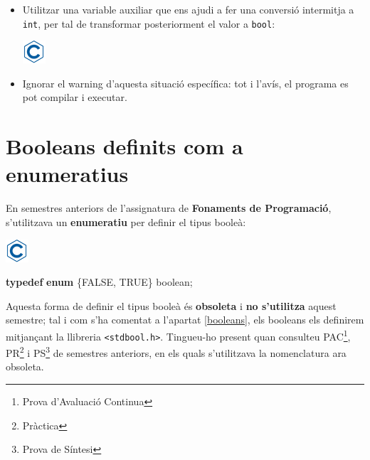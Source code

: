 \documentclass[]{book}
\newenvironment{Shaded}{\begin{snugshade}}{\end{snugshade}}
\newcommand{\KeywordTok}[1]{\textcolor[rgb]{0.13,0.29,0.53}{\textbf{#1}}}
\newcommand{\DataTypeTok}[1]{\textcolor[rgb]{0.13,0.29,0.53}{#1}}
\newcommand{\StringTok}[1]{\textcolor[rgb]{0.31,0.60,0.02}{#1}}
\newcommand{\NormalTok}[1]{#1}
\providecommand{\tightlist}{%
  \setlength{\itemsep}{0pt}\setlength{\parskip}{0pt}}
\let\rmarkdownfootnote\footnote%
\def\footnote{\protect\rmarkdownfootnote}
\begin{document}
\begin{itemize}
  \begin{itemize}
  \tightlist
  \item
    Utilitzar una variable auxiliar que ens ajudi a fer una conversió
    intermitja a \texttt{int}, per tal de transformar posteriorment el
    valor a \texttt{bool}:

    \includegraphics{./img/c.png}

\begin{Shaded}
\end{Shaded}
  \item
    Ignorar el warning d'aquesta situació específica: tot i l'avís, el
    programa es pot compilar i executar.
  \end{itemize}
\end{itemize}

\section{Booleans definits com a
enumeratius}\label{booleans-definits-com-a-enumeratius}

En semestres anteriors de l'assignatura de \textbf{Fonaments de
Programació}, s'utilitzava un \textbf{enumeratiu} per definir el tipus
booleà:

\includegraphics{./img/c.png}

\begin{Shaded}
\begin{Highlighting}[]
\KeywordTok{typedef} \KeywordTok{enum}\NormalTok{ \{FALSE, TRUE\} boolean;}
\end{Highlighting}
\end{Shaded}

Aquesta forma de definir el tipus booleà és \textbf{obsoleta} i
\textbf{no s'utilitza} aquest semestre; tal i com s'ha comentat a
l'apartat \ref{booleans}, els booleans els definirem mitjançant la
llibreria \texttt{\textless{}stdbool.h\textgreater{}}. Tingueu-ho
present quan consulteu PAC\footnote{Prova d'Avaluació Continua},
PR\footnote{Pràctica} i PS\footnote{Prova de Síntesi} de semestres
anteriors, en els quals s'utilitzava la nomenclatura ara obsoleta.
\end{document}
